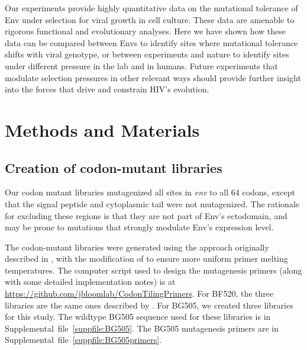 \documentclass[9pt]{elife}
\begin{document}
Our experiments provide highly quantitative data on the mutational tolerance of Env under selection for viral growth in cell culture.
These data are amenable to rigorous functional and evolutionary analyses.
Here we have shown how these data can be compared between Envs to identify sites where mutational tolerance shifts with viral genotype, or between experiments and nature to identify sites under different pressure in the lab and in humans.
Future experiments that modulate selection pressures in other relevant ways should provide further insight into the forces that drive and constrain HIV's evolution.

\clearpage
\section{Methods and Materials}

\subsection{Creation of codon-mutant libraries}
Our codon mutant libraries mutagenized all sites in \textit{env} to all 64 codons, except that the signal peptide and cytoplasmic tail were not mutagenized.
The rationale for excluding these regions is that they are not part of Env's ectodomain, and may be prone to mutations that strongly modulate Env's expression level.

The codon-mutant libraries were generated using the approach originally described in \citet{bloom2014experimentally}, with the modification of \citet{dingens2017comprehensive} to ensure more uniform primer melting temperatures.
The computer script used to design the mutagenesis primers (along with some detailed implementation notes) is at \url{https://github.com/jbloomlab/CodonTilingPrimers}.
For BF520, the three libraries are the same ones described by \citet{dingens2017comprehensive}.
For BG505, we created three libraries for this study.
The wildtype BG505 sequence used for these libraries is in Supplemental~file~\ref{suppfile:BG505}.
The BG505 mutagenesis primers are in Supplemental~file~\ref{suppfile:BG505primers}.
\end{document}
